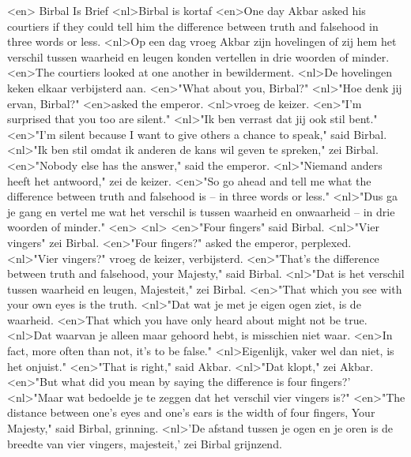 <en> Birbal Is Brief
<nl>Birbal is kortaf
<en>One day Akbar asked his courtiers if they could tell him the difference between truth and falsehood in three words or less.
<nl>Op een dag vroeg Akbar zijn hovelingen of zij hem het verschil tussen waarheid en leugen konden vertellen in drie woorden of minder.
<en>The courtiers looked at one another in bewilderment.
<nl>De hovelingen keken elkaar verbijsterd aan.
<en>"What about you, Birbal?"
<nl>"Hoe denk jij ervan, Birbal?"
<en>asked the emperor.
<nl>vroeg de keizer.
<en>"I'm surprised that you too are silent."
<nl>"Ik ben verrast dat jij ook stil bent."
<en>"I'm silent because I want to give others a chance to speak," said Birbal.
<nl>"Ik ben stil omdat ik anderen de kans wil geven te spreken," zei Birbal.
<en>"Nobody else has the answer," said the emperor.
<nl>"Niemand anders heeft het antwoord," zei de keizer.
<en>"So go ahead and tell me what the difference between truth and falsehood is -- in three words or less."
<nl>"Dus ga je gang en vertel me wat het verschil is tussen waarheid en onwaarheid -- in drie woorden of minder."
<en>
<nl>
<en>"Four fingers" said Birbal.
<nl>"Vier vingers" zei Birbal.
<en>"Four fingers?" asked the emperor, perplexed.
<nl>"Vier vingers?" vroeg de keizer, verbijsterd.
<en>"That's the difference between truth and falsehood, your Majesty," said Birbal.
<nl>"Dat is het verschil tussen waarheid en leugen, Majesteit," zei Birbal.
<en>"That which you see with your own eyes is the truth.
<nl>"Dat wat je met je eigen ogen ziet, is de waarheid.
<en>That which you have only heard about might not be true.
<nl>Dat waarvan je alleen maar gehoord hebt, is misschien niet waar.
<en>In fact, more often than not, it's to be false."
<nl>Eigenlijk, vaker wel dan niet, is het onjuist."
<en>"That is right," said Akbar.
<nl>"Dat klopt," zei Akbar.
<en>"But what did you mean by saying the difference is four fingers?'
<nl>"Maar wat bedoelde je te zeggen dat het verschil vier vingers is?"
<en>"The distance between one's eyes and one's ears is the width of four fingers, Your Majesty," said Birbal, grinning.
<nl>'De afstand tussen je ogen en je oren is de breedte van vier vingers, majesteit,' zei Birbal grijnzend.

